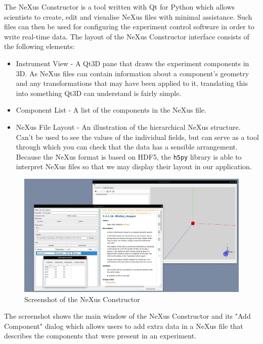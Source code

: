 
The NeXus Constructor is a tool written with Qt for Python which allows scientists to create, edit and visualise NeXus files with minimal assistance. Such files can then be used for configuring the experiment control software in order to write real-time data. The layout of the NeXus Constructor interface consists of the following elements:


\begin{itemize}
\item Instrument View - A Qt3D pane that draws the experiment components in 3D. As NeXus files can contain information about a component's geometry and any transformations that may have been applied to it, translating this into something Qt3D can understand is fairly simple.
\item Component List - A list of the components in the NeXus file.
\item NeXus File Layout - An illustration of the hierarchical NeXus structure. Can't be used to see the values of the individual fields, but can serve as a tool through which you can check that the data has a sensible arrangement. Because the NeXus format is based on HDF5, the \texttt{h5py} library is able to interpret NeXus files so that we may display their layout in our application.
\end{itemize}

\begin{figure}
\caption{Screenshot of the NeXus Constructor}
\includegraphics[width=\linewidth]{screenshot.png}
\end{figure}

The screenshot shows the main window of the NeXus Constructor and its "Add Component" dialog which allows users to add extra data in a NeXus file that describes the components that were present in an experiment.




